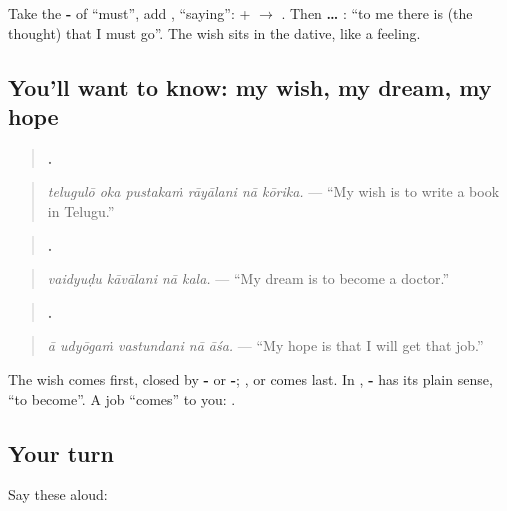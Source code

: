 Take the \textbf{-} of \textquotedblleft{}must\textquotedblright{}, add \textbf{}, \textquotedblleft{}saying\textquotedblright{}: \textbf{} + \textbf{} $\to$ \textbf{}. Then \textbf{ … }: \textquotedblleft{}to me there is (the thought) that I must go\textquotedblright{}. The wish sits in the dative, like a feeling.

\subsection*{You'll want to know: my wish, my dream, my hope}
\begin{quote}
\textbf{     .}
\end{quote}

\begin{quote}
\emph{telugulō oka pustakaṁ rāyālani nā kōrika.} — \textquotedblleft{}My wish is to write a book in Telugu.\textquotedblright{}
\end{quote}

\begin{quote}
\textbf{   .}
\end{quote}

\begin{quote}
\emph{vaidyuḍu kāvālani nā kala.} — \textquotedblleft{}My dream is to become a doctor.\textquotedblright{}
\end{quote}

\begin{quote}
\textbf{    .}
\end{quote}

\begin{quote}
\emph{ā udyōgaṁ vastundani nā āśa.} — \textquotedblleft{}My hope is that I will get that job.\textquotedblright{}
\end{quote}

The wish comes first, closed by \textbf{-} or \textbf{-}; \textbf{ }, \textbf{ } or \textbf{ } comes last. In \textbf{}, \textbf{-} has its plain sense, \textquotedblleft{}to become\textquotedblright{}. A job \textquotedblleft{}comes\textquotedblright{} to you: \textbf{ }.

\subsection*{Your turn}
Say these aloud:


